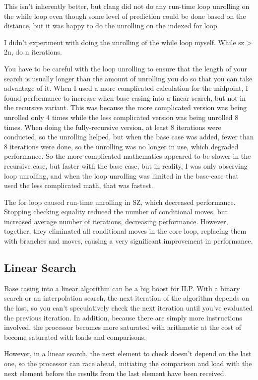 \documentclass{article}
\begin{document}
This isn’t inherently better, but clang did not do any run-time loop unrolling on the while loop even though some level of prediction could be done based on the distance, but it was happy to do the unrolling on the indexed for loop.

I didn’t experiment with doing the unrolling of the while loop myself. While sz > 2n, do n iterations.

You have to be careful with the loop unrolling to ensure that the length of your search is usually longer than the amount of unrolling you do so that you can take advantage of it. When I used a more complicated calculation for the midpoint, I found performance to increase when base-casing into a linear search, but not in the recursive variant. This was because the more complicated version was being unrolled only 4 times while the less complicated version was being unrolled 8 times. When doing the fully-recursive version, at least 8 iterations were conducted, so the unrolling helped, but when the base case was added, fewer than 8 iterations were done, so the unrolling was no longer in use, which degraded performance. So the more complicated mathematics appeared to be slower in the recursive case, but faster with the base case, but in reality, I was only observing loop unrolling, and when the loop unrolling was limited in the base-case that used the less complicated math, that was fastest.

The for loop caused run-time unrolling in SZ, which decreased performance. Stopping checking equality reduced the number of conditional moves, but increased average number of iterations, decreasing performance. However, together, they eliminated all conditional moves in the core loop, replacing them with branches and moves, causing a very significant improvement in performance.

\subsection{Linear Search}
Base casing into a linear algorithm can be a big boost for ILP. With a binary search or an interpolation search, the next iteration of the algorithm depends on the last, so you can’t speculatively check the next iteration until you’ve evaluated the previous iteration. In addition, because there are simply more instructions involved, the processor becomes more saturated with arithmetic at the cost of become saturated with loads and comparisons.

However, in a linear search, the next element to check doesn’t depend on the last one, so the processor can race ahead, initiating the comparison and load with the next element before the results from the last element have been received.
\end{document}
